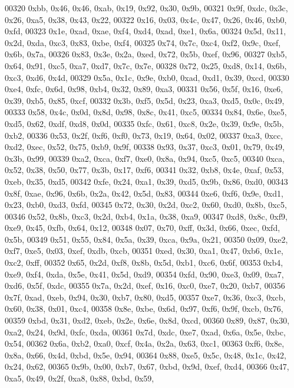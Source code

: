 \begin{DoxyCode}
00320   0xbb, 0x46, 0x46, 0xab, 0x19, 0x92, 0x30, 0x9b,
00321   0x9f, 0xdc, 0x3c, 0x26, 0xa5, 0x38, 0x43, 0x22,
00322   0x16, 0x03, 0x4c, 0x47, 0x26, 0x46, 0xb0, 0xfd,
00323   0x1e, 0xad, 0xae, 0xf4, 0xd4, 0xad, 0xe1, 0x6a,
00324   0x5d, 0x11, 0x2d, 0xda, 0xc3, 0x83, 0xbe, 0xf4,
00325   0x74, 0x7c, 0xc4, 0xf2, 0x9c, 0xef, 0x6b, 0x7a,
00326   0x83, 0x3e, 0x2a, 0xed, 0x72, 0x5b, 0xef, 0x96,
00327   0xb5, 0x64, 0x91, 0xc5, 0xa7, 0xd7, 0x7c, 0x7e,
00328   0x72, 0x25, 0xd8, 0x14, 0x6b, 0xc3, 0xd6, 0x4d,
00329   0x5a, 0x1c, 0x9e, 0xb0, 0xad, 0xd1, 0x39, 0xcd,
00330   0xe4, 0xfc, 0x6d, 0x98, 0xb4, 0x32, 0x89, 0xa3,
00331   0x56, 0x5f, 0x16, 0xe6, 0x39, 0xb5, 0x85, 0xcf,
00332   0x3b, 0xf5, 0x5d, 0x23, 0xa3, 0xd5, 0x0c, 0x49,
00333   0x58, 0x4c, 0x0d, 0x8d, 0x98, 0x8c, 0x41, 0xc5,
00334   0x84, 0x6e, 0xe5, 0xd5, 0x62, 0xdf, 0xd8, 0x0d,
00335   0xfc, 0x61, 0xc8, 0x2e, 0x39, 0x9e, 0x5b, 0xb2,
00336   0x53, 0x2f, 0xf6, 0xf0, 0x73, 0x19, 0x64, 0x02,
00337   0xa3, 0xcc, 0xd2, 0xec, 0x52, 0x75, 0xb9, 0x9f,
00338   0x93, 0x37, 0xc3, 0x01, 0x79, 0x49, 0x3b, 0x99,
00339   0xa2, 0xca, 0xf7, 0xe0, 0x8a, 0x94, 0xc5, 0xc5,
00340   0xca, 0x52, 0x38, 0x50, 0x77, 0x3b, 0x17, 0xf6,
00341   0x32, 0xb8, 0x4e, 0xaf, 0x53, 0xeb, 0x35, 0xd5,
00342   0xfe, 0x24, 0xa1, 0x39, 0xd5, 0x9b, 0x86, 0xd0,
00343   0x8f, 0xae, 0x96, 0x6b, 0x2a, 0x42, 0x5d, 0x83,
00344   0xe6, 0xf6, 0x9e, 0xd1, 0x23, 0xb0, 0xd3, 0xfd,
00345   0x72, 0x30, 0x2d, 0xc2, 0x60, 0xd0, 0x8b, 0xc5,
00346   0x52, 0x8b, 0xc3, 0x2d, 0xb4, 0x1a, 0x38, 0xa9,
00347   0xd8, 0x8c, 0xf9, 0xe9, 0x45, 0xfb, 0x64, 0x12,
00348   0x07, 0x70, 0xff, 0x3d, 0x66, 0xec, 0xfd, 0x5b,
00349   0x51, 0x55, 0x84, 0x5a, 0x39, 0xca, 0x9a, 0x21,
00350   0x09, 0xe2, 0xf7, 0xe5, 0x03, 0xef, 0xdb, 0xcb,
00351   0xed, 0x30, 0xa1, 0x47, 0xb6, 0x1e, 0xc2, 0xff,
00352   0x65, 0x2d, 0xf8, 0x8b, 0x5d, 0xb1, 0xc6, 0x6f,
00353   0xb4, 0xe9, 0xf4, 0xda, 0x5e, 0x41, 0x5d, 0xd9,
00354   0xfd, 0x90, 0xe3, 0x09, 0xa7, 0xd6, 0x5f, 0xdc,
00355   0x7a, 0x2d, 0xef, 0x16, 0xc0, 0xe7, 0x20, 0xb7,
00356   0x7f, 0xad, 0xeb, 0x94, 0x30, 0xb7, 0x80, 0xd5,
00357   0xe7, 0x36, 0xc3, 0xcb, 0x60, 0x38, 0x01, 0xc4,
00358   0x8e, 0xbe, 0x6d, 0x97, 0xf6, 0x9f, 0xcb, 0x76,
00359   0xbd, 0x31, 0xd2, 0xeb, 0x2e, 0x6e, 0x8d, 0xcd,
00360   0x89, 0x87, 0x30, 0xa2, 0x24, 0x9d, 0xfc, 0xda,
00361   0x7d, 0xdc, 0xe7, 0xad, 0x6a, 0x5e, 0xbc, 0x54,
00362   0x6a, 0xb2, 0xa0, 0xcf, 0x4a, 0x2a, 0x63, 0xc1,
00363   0xf6, 0x8e, 0x8a, 0x66, 0x4d, 0xbd, 0x5e, 0x94,
00364   0x88, 0xe5, 0x5c, 0x48, 0x1c, 0x42, 0x24, 0x62,
00365   0x9b, 0x00, 0xb7, 0x67, 0xbd, 0x9d, 0xef, 0xd4,
00366   0x47, 0xa5, 0x49, 0x2f, 0xa8, 0x88, 0xbd, 0x59,

\end{DoxyCode}
